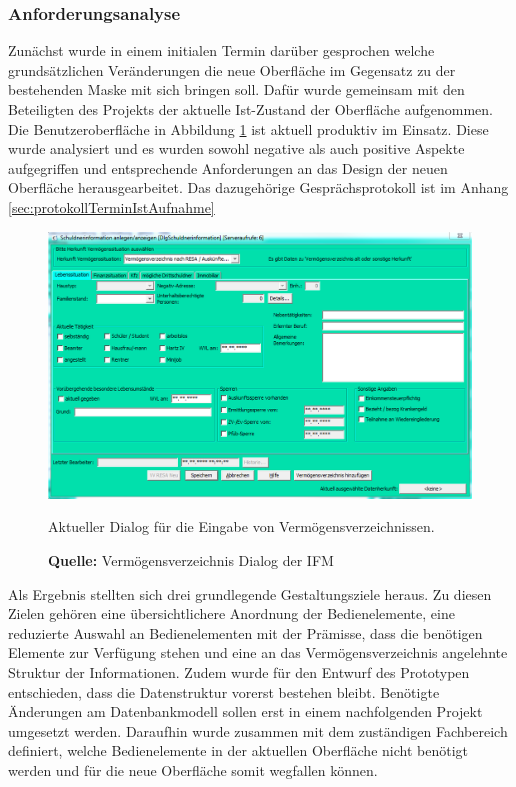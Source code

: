 \subsubsection{Anforderungsanalyse}
Zunächst wurde in einem initialen Termin darüber gesprochen welche grundsätzlichen Veränderungen die neue Oberfläche im Gegensatz zu der bestehenden Maske mit sich bringen soll. Dafür wurde gemeinsam mit den Beteiligten des Projekts der aktuelle Ist-Zustand der Oberfläche aufgenommen. Die Benutzeroberfläche in Abbildung \ref{fig:aktuellerDialog} ist aktuell produktiv im Einsatz. Diese wurde analysiert und es wurden sowohl negative als auch positive Aspekte aufgegriffen und entsprechende Anforderungen an das Design der neuen Oberfläche herausgearbeitet. Das dazugehörige Gesprächsprotokoll ist im Anhang \ref{sec:protokollTerminIstAufnahme}
\begin{figure}[H]
  \centering
  \includegraphics[scale=1]{img/alter_Dialog2.PNG}
  \caption{Aktueller Dialog für die Eingabe von Vermögensverzeichnissen.}
  \caption*{\textbf{Quelle:} Vermögensverzeichnis Dialog der IFM}
  \label{fig:aktuellerDialog}
\end{figure}
Als Ergebnis stellten sich drei grundlegende Gestaltungsziele heraus. Zu diesen Zielen gehören eine übersichtlichere Anordnung der Bedienelemente, eine reduzierte Auswahl an Bedienelementen mit der Prämisse, dass die benötigen Elemente zur Verfügung stehen und eine an das Vermögensverzeichnis angelehnte Struktur der Informationen. Zudem wurde für den Entwurf des Prototypen entschieden, dass die Datenstruktur vorerst bestehen bleibt. Benötigte Änderungen am Datenbankmodell sollen erst in einem nachfolgenden Projekt umgesetzt werden. Daraufhin wurde zusammen mit dem zuständigen Fachbereich definiert, welche Bedienelemente in der aktuellen Oberfläche nicht benötigt werden und für die neue Oberfläche somit wegfallen können.

